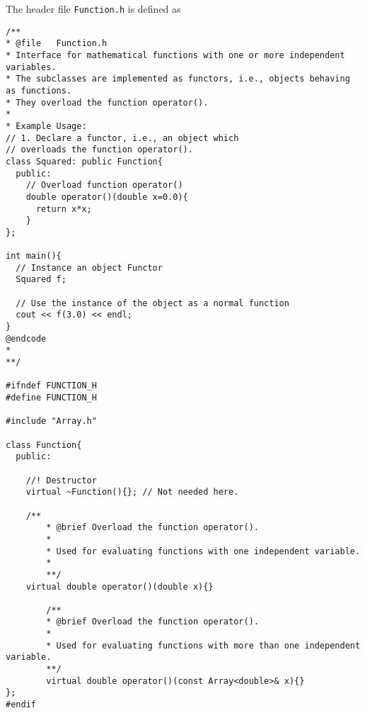 The header file \lstinline{Function.h} is defined as 
\begin{lstlisting}
/**
* @file   Function.h
* Interface for mathematical functions with one or more independent variables.
* The subclasses are implemented as functors, i.e., objects behaving as functions. 
* They overload the function operator().
*
* Example Usage:
// 1. Declare a functor, i.e., an object which 
// overloads the function operator().
class Squared: public Function{
  public:
    // Overload function operator()
    double operator()(double x=0.0){
      return x*x;
    }
};

int main(){
  // Instance an object Functor
  Squared f;

  // Use the instance of the object as a normal function
  cout << f(3.0) << endl;
}
@endcode
*
**/

#ifndef FUNCTION_H
#define FUNCTION_H

#include "Array.h"

class Function{
  public:
  
	//! Destructor
	virtual ~Function(){}; // Not needed here.
    
    /**
		* @brief Overload the function operator().
		*
		* Used for evaluating functions with one independent variable.
		*
		**/
    virtual double operator()(double x){}
		
		/**
		* @brief Overload the function operator().
		*
		* Used for evaluating functions with more than one independent variable.
		**/
		virtual double operator()(const Array<double>& x){}
};
#endif

\end{lstlisting}

